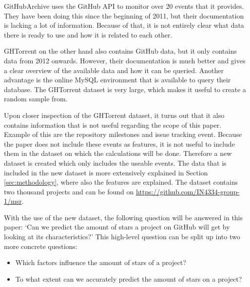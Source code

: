     GitHubArchive uses the GitHub API to monitor over 20 events \cite{github-events-2016} that it provides. 
    They have been doing this since the beginning of 2011, but their documentation is lacking a lot of information.
    Because of that, it is not entirely clear what data there is ready to use and how it is related to each other.
    
    GHTorrent on the other hand also contains GitHub data, but it only contains data from 2012 onwards.
    However, their documentation is much better and gives a clear overview of the available data and how it can be queried.
    Another advantage is the online MySQL environment \cite{ghtorrent-dblit-2016} that is available to query their database.
    The GHTorrent dataset is very large, which makes it useful to create a random sample from.



    Upon closer inspection of the GHTorrent dataset, it turns out that it also contains information that is not useful regarding the scope of this paper. 
    Example of this are the repository milestones and issue tracking event.
    Because the paper does not include these events as features, it is not useful to include them in the dataset on which the calculations will be done. 
    Therefore a new dataset is created which only includes the useable events. 
    The data that is included in the new dataset is more extensively explained in Section \ref{sec:methodology}, where also the features are explained.
    The dataset contains two thousand projects and can be found on \url{https://github.com/IN4334-group-1/msr}.

    With the use of the new dataset, the following question will be answered in this paper: `Can we predict the amount of stars a project on GitHub will get by looking at its characteristics?'
    This high-level question can be split up into two more concrete questions:
    \begin{itemize}
        \item Which factors influence the amount of stars of a project?
        \item To what extent can we accurately predict the amount of stars on a project?
    \end{itemize}




